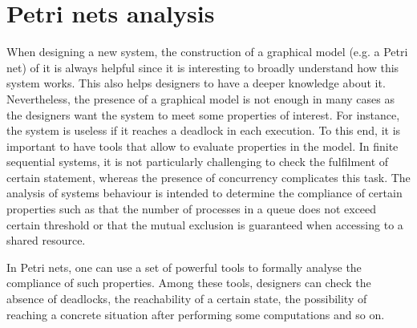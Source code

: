 %
%

\section{Petri nets analysis}
When designing a new system, the construction of a graphical model (e.g. a Petri net) of it is always
helpful since it is interesting to broadly understand how this system works. This also helps designers to have a
deeper knowledge about it. Nevertheless, the presence of a graphical model is not enough in many cases
as the designers want the system to meet some properties of interest. For instance, the system is useless
if it reaches a deadlock in each execution.  To this end, it is important to have tools that allow to
evaluate properties in the model. In finite sequential systems, it is not particularly challenging to check
the fulfilment of certain statement, whereas the presence of concurrency complicates this task.
The analysis of systems behaviour is intended to determine the compliance of 
certain properties such as that the number of processes in a queue does not exceed
certain threshold or that the mutual exclusion is guaranteed when accessing to a shared resource.

In Petri nets, one can use a set of powerful tools to formally analyse
the compliance of such properties. Among these tools, designers can check
the absence of deadlocks, the reachability of a certain
state, the possibility of reaching a concrete situation after performing some computations and so on.


